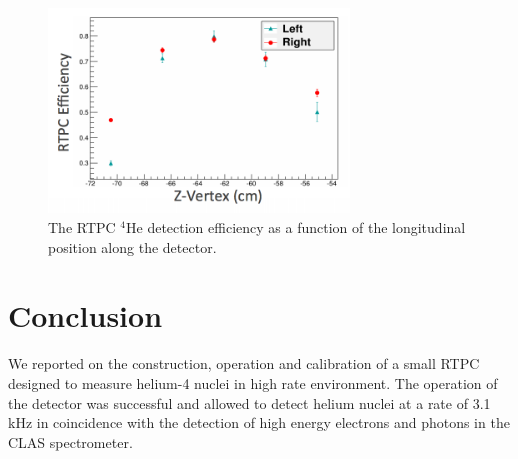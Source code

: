 \documentclass[preprint,5p]{elsarticle}
\begin{document}
\begin{figure}[tb]
\centering
\includegraphics[width=8cm]{fig/tpceff.png}
\caption{The RTPC $^4$He detection efficiency as a function of the longitudinal 
   position along the detector.
 \label{fig:rtpc_eff}}
 \end{figure}


\section{Conclusion}

We reported on the construction, operation and calibration of a small RTPC 
designed to measure helium-4 nuclei in high rate environment. The operation
of the detector was successful and allowed to detect helium nuclei at a rate
of 3.1 kHz in coincidence with the detection of high energy electrons and 
photons in the CLAS spectrometer. 

  
\end{document}
